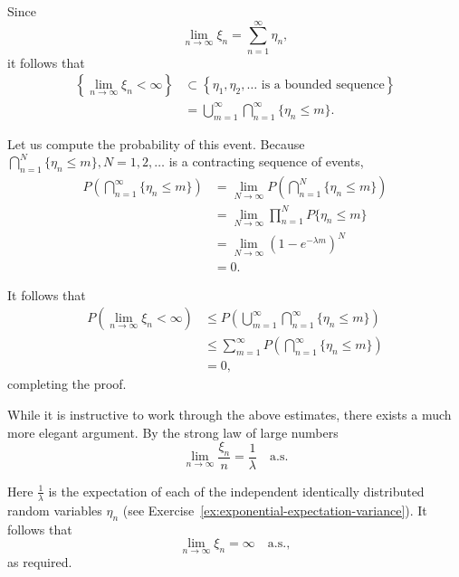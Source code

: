 \begin{Solution}
Since
\[
\lim_{n \to \infty} \xi_n = \sum_{n=1}^{\infty} \eta_n,
\]
it follows that
\begin{equation}
\begin{aligned}
\left\{\lim_{n \to \infty} \xi_n < \infty\right\} &\subset \left\{\eta_1, \eta_2, \ldots \text{ is a bounded sequence}\right\} \\
&= \bigcup_{m=1}^{\infty} \bigcap_{n=1}^{\infty} \{\eta_n \leq m\}.
\end{aligned}
\end{equation}

Let us compute the probability of this event. Because $\bigcap_{n=1}^{N} \{\eta_n \leq m\}, N = 1, 2, \ldots$ is a contracting sequence of events,
\begin{equation}
\begin{aligned}
P\left(\bigcap_{n=1}^{\infty} \{\eta_n \leq m\}\right) &= \lim_{N \to \infty} P\left(\bigcap_{n=1}^{N} \{\eta_n \leq m\}\right) \\
&= \lim_{N \to \infty} \prod_{n=1}^{N} P\{\eta_n \leq m\} \\
&= \lim_{N \to \infty} (1 - e^{-\lambda m})^N \\
&= 0.
\end{aligned}
\end{equation}

It follows that
\begin{equation}
\begin{aligned}
P\left(\lim_{n \to \infty} \xi_n < \infty\right) &\leq P\left(\bigcup_{m=1}^{\infty} \bigcap_{n=1}^{\infty} \{\eta_n \leq m\}\right) \\
&\leq \sum_{m=1}^{\infty} P\left(\bigcap_{n=1}^{\infty} \{\eta_n \leq m\}\right) \\
&= 0,
\end{aligned}
\end{equation}
completing the proof.

While it is instructive to work through the above estimates, there exists a much more elegant argument. By the strong law of large numbers
\[
\lim_{n \to \infty} \frac{\xi_n}{n} = \frac{1}{\lambda} \quad \text{a.s.}
\]

Here $\frac{1}{\lambda}$ is the expectation of each of the independent identically distributed random variables $\eta_n$ (see Exercise~\ref{ex:exponential-expectation-variance}). It follows that
\[
\lim_{n \to \infty} \xi_n = \infty \quad \text{a.s.},
\]
as required.
\end{Solution}

